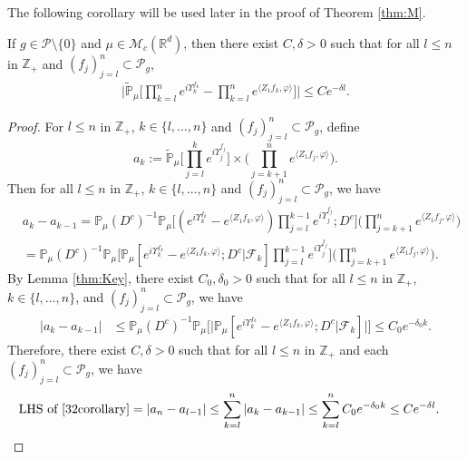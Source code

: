 \documentclass[EJP]{ejpecp} %
\begin{document}
The following corollary  will be used later in the proof of Theorem \ref{thm:M}.
\begin{corollary}
  \label{cor:MI}
If  $g\in \mathcal{P}\setminus\{0\}$ and $\mu\in \mathcal M_c(\mathbb R^d)$, then there exist $C,\delta>0$ such that for
all $l\leq n$ in $\mathbb Z_+$ and  $(f_j)_{j=l}^n\subset \mathcal P_g$,
\begin{align}
  \label{32corollary}
  \Big|\mathbb{\widetilde{P}}_{\mu}\Big[\prod_{k=l}^ne^{i \Upsilon^{f_k}_{k} }-\prod_{k=l}^n e^{\langle Z_1f_k, \varphi\rangle}\Big]\Big|\leq C e^{-\delta l}.
\end{align}
\end{corollary}
\begin{proof}
  For  $l\leq n$ in $\mathbb Z_+$, $k \in \{l,\dots,n\}$ and $(f_j)_{j=l}^n\subset \mathcal P_g$, define
  \[
    a_k
    :=  \mathbb{\widetilde{P}}_{\mu}\Big[\prod_{j=l}^{k} e^{i\Upsilon_j^{f_j}}\Big] \times \Big(\prod_{j=k+1}^{n} e^{ \langle Z_1f_j,\varphi \rangle} \Big).
  \]
  Then for all $l\leq n$ in $\mathbb Z_+$, $k \in \{l,\dots,n\}$ and $(f_j)_{j=l}^n\subset \mathcal P_g$, we have
  \begin{align}
    & a_{k} - a_{k-1}
      =\mathbb{P}_{\mu}(D^c)^{-1} \mathbb{P}_{\mu}\Big[(e^{i\Upsilon^{f_k}_k}-e^{\langle Z_1f_k, \varphi\rangle})\prod_{j=l}^{k-1} e^{i\Upsilon_j^{f_j}};D^c\Big] \Big(\prod_{j=k+1}^n e^{\langle Z_1f_j, \varphi\rangle}\Big)\\
    & =\mathbb{P}_{\mu}(D^c)^{-1} \mathbb{P}_{\mu}\Big[\mathbb P_\mu[e^{i\Upsilon_k^{f_k}}-e^{\langle Z_1f_k, \varphi \rangle}; D^c|\mathscr F_k] \prod_{j=l}^{k-1} e^{i\Upsilon_j^{f_j}}\Big] \Big(\prod_{j=k+1}^{n}e^{\langle Z_1f_j, \varphi\rangle}\Big).
  \end{align}
  By Lemma \ref{thm:Key}, there exist $C_0,\delta_0 >0$ such that for all $l\leq n$ in $\mathbb Z_+$,  $k \in \{l,\dots , n\}$, and $(f_j)_{j=l}^n\subset \mathcal P_g$, we have
  \begin{align}
    | a_{k} - a_{k-1}|
    & \leq \mathbb{P}_{\mu}(D^c)^{-1}\mathbb{P}_{\mu}\Big[\big|\mathbb P_\mu[e^{i\Upsilon_k^{f_k}}-e^{\langle Z_1f_k, \varphi \rangle}; D^c | \mathscr{F}_k]\big|\Big]
    \leq C_0 e^{-\delta_0 k}.
  \end{align}
  Therefore, there exist $C,\delta >0$ such that for all $l\leq n$ in $\mathbb Z_+$ and each $(f_j)_{j=l}^n\subset \mathcal P_g$, we have
  \begin{align}
    \text{LHS of \eqref{32corollary}}
    & = \left|a_n-a_{l-1}\right|
      \leq \sum_{k=l}^n\left|a_{k}-a_{k-1}\right|
      \leq \sum_{k=l}^n C_0 e^{-\delta_0 k}
      \leq C e^{- \delta l}.
      \qedhere
  \end{align}
\end{proof}
\end{document}
